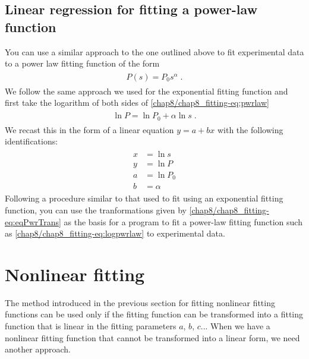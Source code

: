 \documentclass[letterpaper,10pt,english]{sphinxmanual}
\begin{document}

\subsection{Linear regression for fitting a power-law function}
\label{chap8/chap8_fitting:linear-regression-for-fitting-a-power-law-function}\label{chap8/chap8_fitting:index-3}
You can use a similar approach to the one outlined above to fit experimental data to a power law fitting function of the form
\label{chap8/chap8_fitting:equation-eq:pwrlaw}\begin{gather}
\begin{split}P(s) = P_0 s^\alpha \;.\end{split}\label{chap8/chap8_fitting-eq:pwrlaw}
\end{gather}
We follow the same approach we used for the exponential fitting function and first take the logarithm of both sides of \eqref{chap8/chap8_fitting-eq:pwrlaw}
\label{chap8/chap8_fitting:equation-eq:logpwrlaw}\begin{gather}
\begin{split}\ln P = \ln P_0 + \alpha \ln s \;.\end{split}\label{chap8/chap8_fitting-eq:logpwrlaw}
\end{gather}
We recast this in the form of a linear equation \(y = a + bx\) with the following identifications:
\label{chap8/chap8_fitting:equation-eq:eqPwrTrans}\begin{gather}
\begin{split}x &= \ln s\\
y &= \ln P\\
a &= \ln P_{0}\\
b &= \alpha\end{split}\label{chap8/chap8_fitting-eq:eqPwrTrans}
\end{gather}
Following a procedure similar to that used to fit using an exponential fitting function, you can use the tranformations given by \eqref{chap8/chap8_fitting-eq:eqPwrTrans} as the basis for a program to fit a power-law fitting function such as \eqref{chap8/chap8_fitting-eq:logpwrlaw} to experimental data.


\section{Nonlinear fitting}
\label{chap8/chap8_fitting:index-4}\label{chap8/chap8_fitting:sec-nonlinfit}\label{chap8/chap8_fitting:nonlinear-fitting}
The method introduced in the previous section for fitting nonlinear fitting functions can be used only if the fitting function can be transformed into a fitting function that is linear in the fitting parameters  \(a\), \(b\), \(c\)...  When we have a nonlinear fitting function that cannot be transformed into a linear form, we need another approach.
\end{document}
